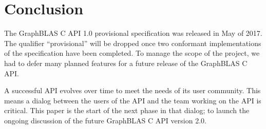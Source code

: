 %
%
\section{Conclusion}
\label{sec:conclusion}

The GraphBLAS C API 1.0 provisional specification was released in May of 2017.  The qualifier ``provisional'' will be dropped once
two conformant implementations of the specification have been completed.  To manage the scope of the project,
we had to defer many planned features for a future release of the GraphBLAS C API.  

A successful API evolves over time to meet the needs of its user community.   This means a dialog
between the users of the API and the team working on the API is critical.  This paper is the start of the next
phase in that dialog; to launch the ongoing discussion of the future GraphBLAS C API version 2.0.
